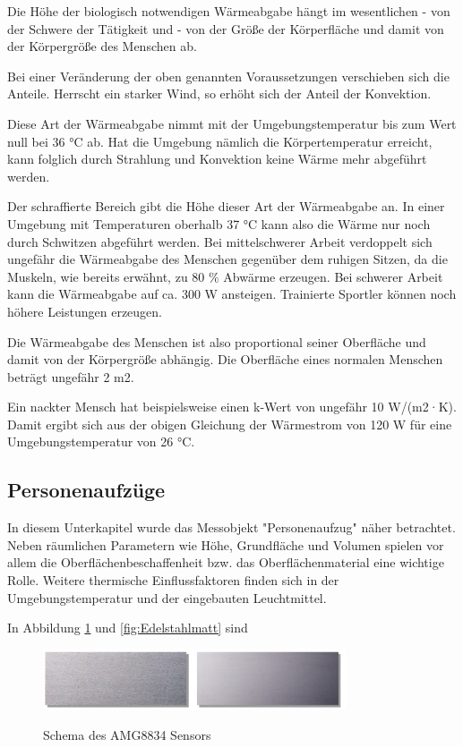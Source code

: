 Die Höhe der biologisch notwendigen Wärmeabgabe hängt im wesentlichen
- von der Schwere der Tätigkeit und
- von der Größe der Körperfläche 
und damit von der Körpergröße des Menschen ab.

Bei einer Veränderung der oben genannten Voraussetzungen verschieben sich die Anteile. Herrscht ein starker Wind, so erhöht sich der Anteil der Konvektion.

Diese Art der Wärmeabgabe nimmt mit der Umgebungstemperatur bis zum Wert null bei 36 °C ab. Hat die Umgebung nämlich die Körpertemperatur erreicht, kann folglich durch Strahlung und Konvektion keine Wärme mehr abgeführt werden.

Der schraffierte Bereich gibt die Höhe dieser Art der
Wärmeabgabe an. In einer Umgebung mit Temperaturen oberhalb 37 °C kann also die Wärme
nur noch durch Schwitzen abgeführt werden. Bei mittelschwerer Arbeit verdoppelt sich
ungefähr die Wärmeabgabe des Menschen gegenüber dem ruhigen Sitzen, da die Muskeln,
wie bereits erwähnt, zu 80 \% Abwärme erzeugen. Bei schwerer Arbeit kann die Wärmeabgabe auf ca. 300 W ansteigen. Trainierte Sportler können noch höhere Leistungen erzeugen.

Die
Wärmeabgabe des Menschen ist also proportional seiner Oberfläche und damit von der Körpergröße abhängig. Die Oberfläche eines normalen Menschen beträgt ungefähr 2 m2.

Ein nackter Mensch hat beispielsweise einen k-Wert von
ungefähr 10 W/(m2·K). Damit ergibt sich aus der obigen Gleichung der Wärmestrom von 120
W für eine Umgebungstemperatur von 26 °C. \cite{MenschWaerme}

\subsection{Personenaufzüge}

In diesem Unterkapitel wurde das Messobjekt "Personenaufzug" näher betrachtet. Neben räumlichen Parametern wie Höhe, Grundfläche und Volumen spielen vor allem die Oberflächenbeschaffenheit bzw. das Oberflächenmaterial eine wichtige Rolle. Weitere thermische Einflussfaktoren finden sich in der Umgebungstemperatur und der eingebauten Leuchtmittel.



In Abbildung \ref{fig:Edelstahlgewalzt} und \ref{fig:Edelstahlmatt} sind 
\begin{figure}[H]
	\centering
	\includegraphics[width=0.8\textwidth]
	{fig/Edelstahl_gewalzt.PNG}
	\caption[Schema des AMG8834 Sensors]{Schema des AMG8834 Sensors} \protect\cite{Edelstahl}
	\label{fig:Edelstahlgewalzt}
\end{figure}


